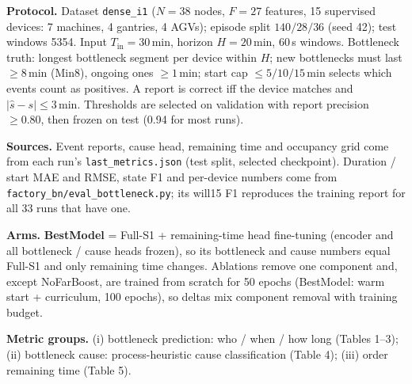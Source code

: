 \documentclass[9pt,a4paper,twocolumn]{extarticle}
\begin{document}

\textbf{Protocol.}
Dataset \texttt{dense\_i1} ($N{=}38$ nodes, $F{=}27$ features, 15 supervised devices: 7 machines, 4 gantries, 4 AGVs);
episode split $140/28/36$ (seed 42); test windows 5354.
Input $T_{\mathrm{in}}{=}30$\,min, horizon $H{=}20$\,min, 60\,s windows.
Bottleneck truth: longest bottleneck segment per device within $H$; new bottlenecks must last $\ge 8$\,min (Min8), ongoing ones $\ge 1$\,min;
start cap $\le 5/10/15$\,min selects which events count as positives.
A report is correct iff the device matches and $|\hat{s}-s|\le 3$\,min.
Thresholds are selected on validation with report precision $\ge 0.80$, then frozen on test (0.94 for most runs).

\textbf{Sources.}
Event reports, cause head, remaining time and occupancy grid come from each run's \texttt{last\_metrics.json} (test split, selected checkpoint).
Duration / start MAE and RMSE, state F1 and per-device numbers come from \texttt{factory\_bn/eval\_bottleneck.py}; its will15 F1 reproduces the training report for all 33 runs that have one.

\textbf{Arms.}
\textbf{BestModel} = Full-S1 + remaining-time head fine-tuning (encoder and all bottleneck / cause heads frozen), so its bottleneck and cause numbers equal Full-S1 and only remaining time changes.
Ablations remove one component and, except NoFarBoost, are trained from scratch for 50 epochs (BestModel: warm start + curriculum, 100 epochs), so deltas mix component removal with training budget.

\textbf{Metric groups.}
(i) bottleneck prediction: who / when / how long (Tables 1--3);
(ii) bottleneck cause: process-heuristic cause classification (Table 4);
(iii) order remaining time (Table 5).
\end{document}
